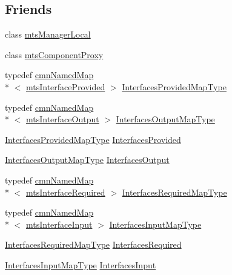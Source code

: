 \subsection*{Friends}
\begin{DoxyCompactItemize}
\item 
class \hyperlink{classmts_component_a31c1c611dbb103ac58ed40d84960baa0}{mts\-Manager\-Local}
\item 
class \hyperlink{classmts_component_a744ae66bbeeeba6ef38e59a2dd5e9743}{mts\-Component\-Proxy}
\end{DoxyCompactItemize}
\begin{DoxyCompactItemize}
\item 
typedef \hyperlink{classcmn_named_map}{cmn\-Named\-Map}\\*
$<$ \hyperlink{classmts_interface_provided}{mts\-Interface\-Provided} $>$ \hyperlink{classmts_component_a1d4117bf122737abe5f943a7ce057ff6}{Interfaces\-Provided\-Map\-Type}
\item 
typedef \hyperlink{classcmn_named_map}{cmn\-Named\-Map}\\*
$<$ \hyperlink{classmts_interface_output}{mts\-Interface\-Output} $>$ \hyperlink{classmts_component_afa3bfa3828ea8532dbbca641006e9589}{Interfaces\-Output\-Map\-Type}
\item 
\hyperlink{classmts_component_a1d4117bf122737abe5f943a7ce057ff6}{Interfaces\-Provided\-Map\-Type} \hyperlink{classmts_component_ae8842384f42ea5f46b1f39c3e8eddb36}{Interfaces\-Provided}
\item 
\hyperlink{classmts_component_afa3bfa3828ea8532dbbca641006e9589}{Interfaces\-Output\-Map\-Type} \hyperlink{classmts_component_a104e4fc2443e8f15304027701a9c1a8c}{Interfaces\-Output}
\end{DoxyCompactItemize}
\begin{DoxyCompactItemize}
\item 
typedef \hyperlink{classcmn_named_map}{cmn\-Named\-Map}\\*
$<$ \hyperlink{classmts_interface_required}{mts\-Interface\-Required} $>$ \hyperlink{classmts_component_aa3264a5cc739bccecbb58e5095bdd696}{Interfaces\-Required\-Map\-Type}
\item 
typedef \hyperlink{classcmn_named_map}{cmn\-Named\-Map}\\*
$<$ \hyperlink{classmts_interface_input}{mts\-Interface\-Input} $>$ \hyperlink{classmts_component_adfb95e70effe37bd6e8a66388cc9c9ed}{Interfaces\-Input\-Map\-Type}
\item 
\hyperlink{classmts_component_aa3264a5cc739bccecbb58e5095bdd696}{Interfaces\-Required\-Map\-Type} \hyperlink{classmts_component_a41da426dbdbe602272c9ab0d8958bfd4}{Interfaces\-Required}
\item 
\hyperlink{classmts_component_adfb95e70effe37bd6e8a66388cc9c9ed}{Interfaces\-Input\-Map\-Type} \hyperlink{classmts_component_a64fd1c940ac3672259a942ecbaaf40be}{Interfaces\-Input}
\end{DoxyCompactItemize}


